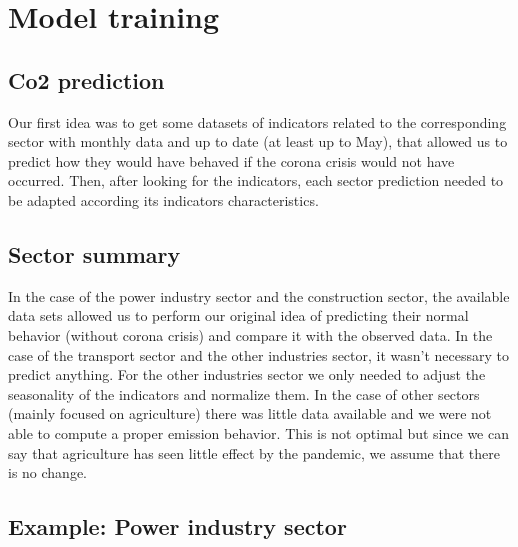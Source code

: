 \section*{Model training}



\subsection*{Co2 prediction}

Our first idea was to get some datasets of indicators related to the corresponding sector with monthly data and up to date (at least up to May), that allowed us to predict how they would have behaved if the corona crisis would not have occurred. Then, after looking for the indicators, each sector prediction needed to be adapted according its indicators characteristics.


\subsection*{Sector summary}

In the case of the power industry sector and the construction sector, the available data sets  allowed us to perform our original idea of predicting their normal behavior (without corona crisis) and compare it with the observed data. In the case of the transport sector and the other industries sector, it wasn't necessary to predict anything. For the other industries sector we only needed to adjust the seasonality of the indicators and normalize them. In the case of other sectors (mainly focused on agriculture) there was little data available and we were not able to compute a proper emission behavior. This is not optimal but since we can say that agriculture has seen little effect by the pandemic, we assume that there is no change.

\subsection*{Example: Power industry sector}


